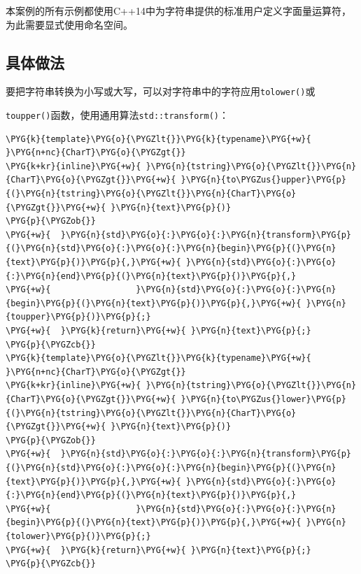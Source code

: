 
本案例的所有示例都使用C++14中为字符串提供的标准用户定义字面量运算符，为此需要显式使用命名空间。



\subsection{具体做法}



要把字符串转换为小写或大写，可以对字符串中的字符应用\texttt{tolower()}或



\texttt{toupper()}函数，使用通用算法\texttt{std::\allowbreak{}transform()}：



\begin{codeblockbg}
\begin{Verbatim}[commandchars=\\\{\},breaklines=true,breakanywhere=true,fontsize=\codefont,xleftmargin=17bp]
\PYG{k}{template}\PYG{o}{\PYGZlt{}}\PYG{k}{typename}\PYG{+w}{ }\PYG{n+nc}{CharT}\PYG{o}{\PYGZgt{}}
\PYG{k+kr}{inline}\PYG{+w}{ }\PYG{n}{tstring}\PYG{o}{\PYGZlt{}}\PYG{n}{CharT}\PYG{o}{\PYGZgt{}}\PYG{+w}{ }\PYG{n}{to\PYGZus{}upper}\PYG{p}{(}\PYG{n}{tstring}\PYG{o}{\PYGZlt{}}\PYG{n}{CharT}\PYG{o}{\PYGZgt{}}\PYG{+w}{ }\PYG{n}{text}\PYG{p}{)}
\PYG{p}{\PYGZob{}}
\PYG{+w}{  }\PYG{n}{std}\PYG{o}{:}\PYG{o}{:}\PYG{n}{transform}\PYG{p}{(}\PYG{n}{std}\PYG{o}{:}\PYG{o}{:}\PYG{n}{begin}\PYG{p}{(}\PYG{n}{text}\PYG{p}{)}\PYG{p}{,}\PYG{+w}{ }\PYG{n}{std}\PYG{o}{:}\PYG{o}{:}\PYG{n}{end}\PYG{p}{(}\PYG{n}{text}\PYG{p}{)}\PYG{p}{,}
\PYG{+w}{                 }\PYG{n}{std}\PYG{o}{:}\PYG{o}{:}\PYG{n}{begin}\PYG{p}{(}\PYG{n}{text}\PYG{p}{)}\PYG{p}{,}\PYG{+w}{ }\PYG{n}{toupper}\PYG{p}{)}\PYG{p}{;}
\PYG{+w}{  }\PYG{k}{return}\PYG{+w}{ }\PYG{n}{text}\PYG{p}{;}
\PYG{p}{\PYGZcb{}}
\PYG{k}{template}\PYG{o}{\PYGZlt{}}\PYG{k}{typename}\PYG{+w}{ }\PYG{n+nc}{CharT}\PYG{o}{\PYGZgt{}}
\PYG{k+kr}{inline}\PYG{+w}{ }\PYG{n}{tstring}\PYG{o}{\PYGZlt{}}\PYG{n}{CharT}\PYG{o}{\PYGZgt{}}\PYG{+w}{ }\PYG{n}{to\PYGZus{}lower}\PYG{p}{(}\PYG{n}{tstring}\PYG{o}{\PYGZlt{}}\PYG{n}{CharT}\PYG{o}{\PYGZgt{}}\PYG{+w}{ }\PYG{n}{text}\PYG{p}{)}
\PYG{p}{\PYGZob{}}
\PYG{+w}{  }\PYG{n}{std}\PYG{o}{:}\PYG{o}{:}\PYG{n}{transform}\PYG{p}{(}\PYG{n}{std}\PYG{o}{:}\PYG{o}{:}\PYG{n}{begin}\PYG{p}{(}\PYG{n}{text}\PYG{p}{)}\PYG{p}{,}\PYG{+w}{ }\PYG{n}{std}\PYG{o}{:}\PYG{o}{:}\PYG{n}{end}\PYG{p}{(}\PYG{n}{text}\PYG{p}{)}\PYG{p}{,}
\PYG{+w}{                 }\PYG{n}{std}\PYG{o}{:}\PYG{o}{:}\PYG{n}{begin}\PYG{p}{(}\PYG{n}{text}\PYG{p}{)}\PYG{p}{,}\PYG{+w}{ }\PYG{n}{tolower}\PYG{p}{)}\PYG{p}{;}
\PYG{+w}{  }\PYG{k}{return}\PYG{+w}{ }\PYG{n}{text}\PYG{p}{;}
\PYG{p}{\PYGZcb{}}
\end{Verbatim}
\end{codeblockbg}


